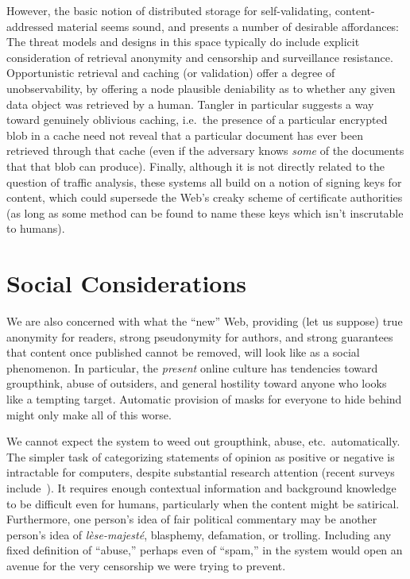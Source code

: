 \documentclass[oneside]{zarticle}
\begin{document}
However, the basic notion of distributed storage for self-validating,
content-addressed material seems sound, and presents a number of
desirable affordances: The threat models and designs in this space
typically do include explicit consideration of retrieval anonymity and
censorship and surveillance resistance.  Opportunistic retrieval and
caching (or validation) offer a degree of unobservability, by offering
a node plausible deniability as to whether any given data object was
retrieved by a human.  Tangler in particular suggests a way toward
genuinely oblivious caching, i.e.\ the presence of a particular
encrypted blob in a cache need not reveal that a particular document
has ever been retrieved through that cache (even if the adversary
knows \emph{some} of the documents that that blob can produce).
Finally, although it is not directly related to the question of
traffic analysis, these systems all build on a notion of signing keys
for content, which could supersede the Web's creaky scheme of
certificate authorities (as long as some method can be found to
name these keys which isn't inscrutable to humans).

\section{Social Considerations}

We are also concerned with what the “new” Web, providing (let us
suppose) true anonymity for readers, strong pseudonymity for authors,
and strong guarantees that content once published cannot be removed,
will look like as a social phenomenon.  In particular, the
\emph{present} online culture has tendencies toward groupthink, abuse
of outsiders, and general hostility toward anyone who looks like a
tempting target.  Automatic provision of masks for everyone to hide
behind might only make all of this worse.

We cannot expect the system to weed out groupthink, abuse,
etc.\ automatically.  The simpler task of categorizing statements of
opinion as positive or negative is intractable for computers, despite
substantial research attention (recent surveys
include~\textcite{liu2012mining,pang2008mining}).  It requires enough
contextual information and background knowledge to be difficult even
for humans, particularly when the content might be
satirical.~\cite{lamarre2009satire} Furthermore, one person's idea of
fair political commentary may be another person's idea of
\textit{lèse-majesté}, blasphemy, defamation, or trolling.  Including
any fixed definition of “abuse,” perhaps even of “spam,” in the system
would open an avenue for the very censorship we were trying to
prevent.
\end{document}
